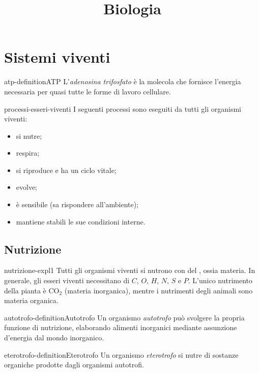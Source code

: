 \documentclass[preview]{standalone}
\begin{document}
\title{Biologia}
\genpage

\section{Sistemi viventi}

\begin{snippetdefinition}{atp-definition}{ATP}
    L'\textit{adenosina trifosfato} è la molecola che fornisce l'energia necessaria per quasi tutte le forme
    di lavoro cellulare.
\end{snippetdefinition}

\begin{snippet}{processi-esseri-viventi}
    I seguenti processi sono eseguiti da tutti gli organismi viventi:
    \begin{itemize}
        \item si nutre;
        \item respira;
        \item si riproduce e ha un ciclo vitale;
        \item evolve;
        \item è sensibile (sa rispondere all'ambiente);
        \item mantiene stabili le sue condizioni interne.
    \end{itemize}
\end{snippet}

\subsection{Nutrizione}

\begin{snippet}{nutrizione-expl1}
Tutti gli organismi viventi si nutrono con del , ossia materia.
In generale, gli esseri viventi necessitano di \(C\), \(O\), \(H\), \(N\), \(S\) e \(P\).
L'unico nutrimento della pianta è CO\({}_2\) (materia inorganica), mentre
i nutrimenti degli animali sono materia organica.
\end{snippet}

\begin{snippetdefinition}{autotrofo-definition}{Autotrofo}
    Un organismo \textit{autotrofo} può svolgere la propria funzione di nutrizione,
    elaborando alimenti inorganici mediante assunzione d'energia dal mondo inorganico.
\end{snippetdefinition}

\begin{snippetdefinition}{eterotrofo-definition}{Eterotrofo}
    Un organismo \textit{eterotrofo}
    si nutre di sostanze organiche prodotte dagli organismi autotrofi.
\end{snippetdefinition}
\end{document}
